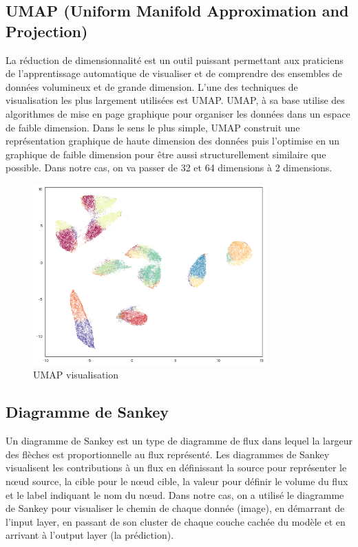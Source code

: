 \documentclass[oneside,13pt,a4paper]{report}
\begin{document}
\subsection{UMAP (Uniform Manifold Approximation and Projection)}
La réduction de dimensionnalité est un outil puissant permettant aux praticiens de l'apprentissage automatique de visualiser et de comprendre des ensembles de données volumineux et de grande dimension. L'une des techniques de visualisation les plus largement utilisées est UMAP.
UMAP, à sa base  utilise des algorithmes de mise en page graphique pour organiser les données dans un espace de faible dimension. Dans le sens le plus simple, UMAP construit une représentation graphique de haute dimension des données puis l'optimise en un graphique de faible dimension pour être aussi structurellement similaire que possible. Dans notre cas, on va passer de 32 et 64 dimensions à 2 dimensions.
\begin{figure}[!h]
	\center
	\includegraphics[width=0.8\textwidth]{img/UMAP.png}
	\caption{UMAP visualisation}
\end{figure}

\subsection{Diagramme de Sankey}
Un diagramme de Sankey est un type de diagramme de flux dans lequel la largeur des flèches est proportionnelle au flux représenté. 
Les diagrammes de Sankey visualisent les contributions à un flux en définissant la source pour représenter le nœud source, la cible pour le nœud cible, la valeur pour définir le volume du flux et le label indiquant le nom du nœud. Dans notre cas, on a utilisé le diagramme de Sankey pour visualiser le chemin de chaque donnée (image), en démarrant de l'input layer, en passant de son cluster de chaque couche cachée du modèle et en arrivant à l'output layer (la prédiction).
\end{document}
